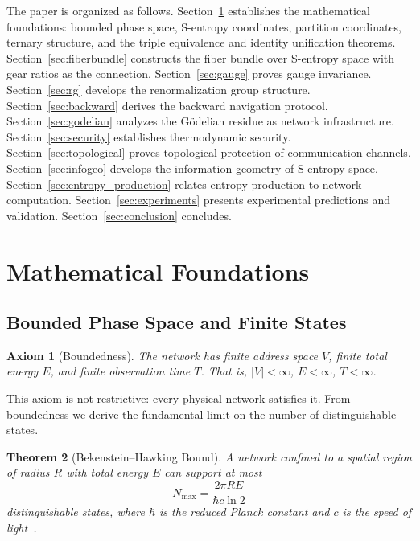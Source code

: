 \documentclass[11pt,twocolumn,a4paper]{article}
\newtheorem{theorem}{Theorem}[section]
\newtheorem{axiom}[theorem]{Axiom}
\theoremstyle{definition}
\begin{document}
The paper is organized as follows. Section~\ref{sec:foundations} establishes the
mathematical foundations: bounded phase space, S-entropy coordinates, partition
coordinates, ternary structure, and the triple equivalence and identity unification
theorems. Section~\ref{sec:fiberbundle} constructs the fiber bundle over S-entropy
space with gear ratios as the connection. Section~\ref{sec:gauge} proves gauge
invariance. Section~\ref{sec:rg} develops the renormalization group structure.
Section~\ref{sec:backward} derives the backward navigation protocol.
Section~\ref{sec:godelian} analyzes the G\"odelian residue as network infrastructure.
Section~\ref{sec:security} establishes thermodynamic security.
Section~\ref{sec:topological} proves topological protection of communication channels.
Section~\ref{sec:infogeo} develops the information geometry of S-entropy space.
Section~\ref{sec:entropy_production} relates entropy production to network computation.
Section~\ref{sec:experiments} presents experimental predictions and validation.
Section~\ref{sec:conclusion} concludes.


\section{Mathematical Foundations}\label{sec:foundations}

\subsection{Bounded Phase Space and Finite States}\label{sec:foundations:bounded}

\begin{axiom}[Boundedness]\label{ax:bounded}
The network has finite address space $V$, finite total energy $E$, and finite observation
time $T$. That is, $|V| < \infty$, $E < \infty$, $T < \infty$.
\end{axiom}

This axiom is not restrictive: every physical network satisfies it. From boundedness
we derive the fundamental limit on the number of distinguishable states.

\begin{theorem}[Bekenstein--Hawking Bound]\label{thm:bekenstein}
A network confined to a spatial region of radius $R$ with total energy $E$ can support
at most
\begin{equation}\label{eq:bekenstein}
  N_{\max} = \frac{2\pi R E}{\hbar c \ln 2}
\end{equation}
distinguishable states, where $\hbar$ is the reduced Planck constant and $c$ is the
speed of light~\cite{bekenstein1973}.
\end{theorem}
\end{document}
